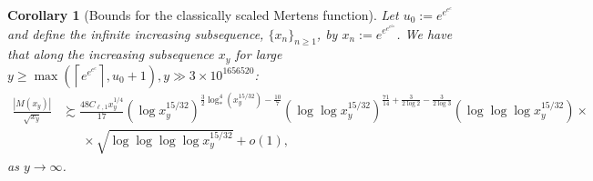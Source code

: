 \documentclass[11pt,reqno,a4letter]{article}
\numberwithin{figure}{section}
\numberwithin{table}{section}
\newcommand{\ceiling}[1]{\left\lceil #1 \right\rceil}
\theoremstyle{plain}
\newtheorem{cor}[theorem]{Corollary}
\numberwithin{theorem}{section}
\theoremstyle{definition}
\begin{document}
\begin{cor}[Bounds for the classically scaled Mertens function] 
\label{cor_ThePipeDreamResult_v1} 
Let $u_0 := e^{e^{e^{e}}}$ and define the infinite increasing subsequence, 
$\{x_n\}_{n \geq 1}$, by $x_n := e^{e^{e^{e^{6n}}}}$. 
We have that along the increasing subsequence $x_y$ for large 
$y \geq \max\left(\ceiling{e^{e^{e^{e}}}}, u_0+1\right), y \gg 3 \times 10^{1656520}$:  
\begin{align*} 
\frac{|M(x_{y})|}{\sqrt{x_{y}}} & \succsim 
     \frac{48 C_{\ell,1} x_y^{1/4}}{17} (\log x_y^{15/32})^{\frac{3}{2} 
      \log_{\ast}^4(x_y^{15/32}) - \frac{10}{7}} 
      (\log\log x_y^{15/32})^{\frac{71}{14} + \frac{3}{2 \log 2} - \frac{3}{2 \log 3}} 
      (\log\log\log x_y^{15/32}) \times \\ 
      & \phantom{\succsim\ } \times 
      \sqrt{\log\log\log\log x_y^{15/32}}  + o(1),  
\end{align*} 
as $y \rightarrow \infty$. 
\end{cor} 
\end{document}
